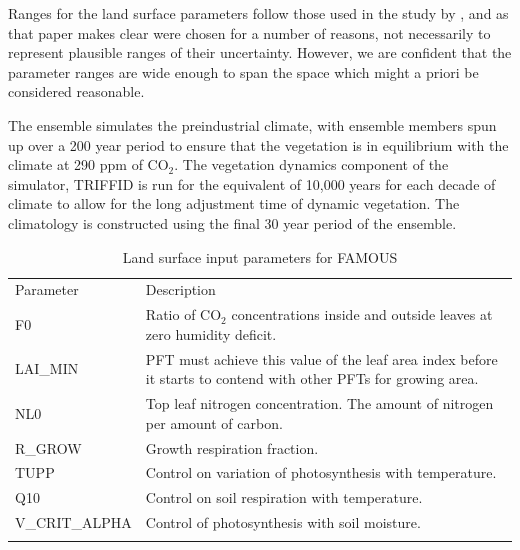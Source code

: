 \documentclass[esd, article]{copernicus} %
\providecommand{\DIFadd}[1]{{\protect\color{blue}\uwave{#1}}} %
\providecommand{\DIFaddbegin}{} %
\providecommand{\DIFaddend}{} %
\begin{document}
Ranges for the land surface parameters follow those used in the study by \cite{booth2012highsensitivity}, and as that paper makes clear were chosen for a number of reasons, not necessarily to represent plausible ranges of their uncertainty. However, we are confident that the parameter ranges are wide enough to span the space which might a priori be considered reasonable.

The ensemble simulates the preindustrial climate, with ensemble members spun up over a 200 year period to ensure that the vegetation is in equilibrium with the climate at 290 ppm of CO$_{2}$. The vegetation dynamics component of the simulator, TRIFFID is run \DIFaddbegin \DIFadd{in "fast spin-up" mode, }\DIFaddend for the equivalent of 10,000 years for each decade of climate \DIFaddbegin \DIFadd{simulation, }\DIFaddend to allow for the long adjustment time of dynamic vegetation. The climatology is constructed using the final 30 year period of the ensemble. 


\begin{table}[t]
\caption{Land surface input parameters for FAMOUS}\label{tab:params}
\begin{tabular}{ll}

\tophline
Parameter &  Description \\
F0              &    Ratio of CO$_2$ concentrations inside and outside leaves at zero humidity deficit. \\
LAI\_MIN    &      PFT must achieve this value of the leaf area index before it starts to contend with other PFTs for growing area. \\
NL0           &      Top leaf nitrogen concentration. The amount of nitrogen per amount of carbon. \\
R\_GROW    &       Growth respiration fraction. \\
TUPP        &    Control on variation of photosynthesis with temperature. \\
Q10           &     Control on soil respiration with temperature. \\
V\_CRIT\_ALPHA  & Control of photosynthesis with soil moisture. \\
\bottomhline
\end{tabular}
\belowtable{} %
\end{table}
\end{document}
